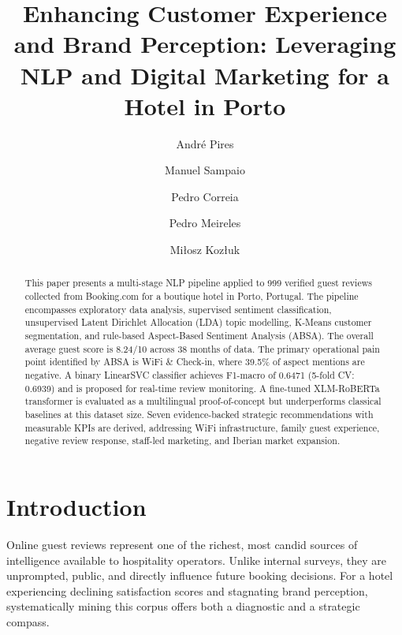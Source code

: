 \documentclass[runningheads]{llncs}
\begin{document}
\title{Enhancing Customer Experience and Brand Perception: Leveraging NLP and Digital Marketing for a Hotel in Porto}


\author{
  Andr\'{e} Pires\and
  Manuel Sampaio\and
  Pedro Correia\and
  Pedro Meireles\and
  Mi\l{}osz Koz\l{}uk
}



\maketitle

\begin{abstract}
This paper presents a multi-stage NLP pipeline applied to 999 verified
guest reviews collected from Booking.com for a boutique hotel in Porto,
Portugal. The pipeline encompasses exploratory data analysis, supervised
sentiment classification, unsupervised Latent Dirichlet Allocation (LDA)
topic modelling, K-Means customer segmentation, and rule-based
Aspect-Based Sentiment Analysis (ABSA). The overall average guest score
is 8.24/10 across 38 months of data. The primary operational pain point
identified by ABSA is WiFi \& Check-in, where 39.5\% of aspect mentions
are negative. A binary LinearSVC classifier achieves F1-macro of 0.6471
(5-fold CV: 0.6939) and is proposed for real-time review monitoring.
A fine-tuned XLM-RoBERTa transformer is evaluated as a multilingual
proof-of-concept but underperforms classical baselines at this dataset
size. Seven evidence-backed strategic recommendations with measurable
KPIs are derived, addressing WiFi infrastructure, family guest
experience, negative review response, staff-led marketing, and Iberian
market expansion.

\end{abstract}

\section{Introduction}

Online guest reviews represent one of the richest, most candid sources
of intelligence available to hospitality operators. Unlike internal
surveys, they are unprompted, public, and directly influence future
booking decisions. For a hotel experiencing declining satisfaction scores
and stagnating brand perception, systematically mining this corpus offers
both a diagnostic and a strategic compass.
\end{document}
